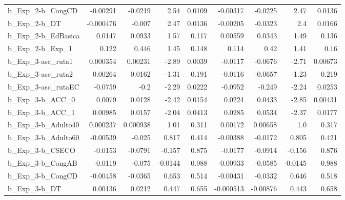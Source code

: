 \begin{tabular}{lrrrrrrrr}
b\_Exp\_2-b\_CongCD           &    -0.00291 &      -0.0219 &      2.54 &   0.0109 &   -0.00317 &     -0.0225 &         2.47 &        0.0136 \\
b\_Exp\_2-b\_DT               &   -0.000476 &       -0.007 &      2.47 &   0.0136 &   -0.00205 &     -0.0323 &          2.4 &        0.0166 \\
b\_Exp\_2-b\_EdBasica         &      0.0147 &       0.0933 &      1.57 &    0.117 &    0.00559 &      0.0343 &         1.49 &         0.136 \\
b\_Exp\_2-b\_Exp\_1            &       0.122 &        0.446 &      1.45 &    0.148 &      0.114 &        0.42 &         1.41 &          0.16 \\
b\_Exp\_3-asc\_ruta1          &    0.000354 &      0.00231 &     -2.89 &   0.0039 &    -0.0117 &     -0.0676 &        -2.71 &       0.00673 \\
b\_Exp\_3-asc\_ruta2          &     0.00264 &       0.0162 &     -1.31 &    0.191 &    -0.0116 &     -0.0657 &        -1.23 &         0.219 \\
b\_Exp\_3-asc\_rutaEC         &     -0.0759 &         -0.2 &     -2.29 &   0.0222 &    -0.0952 &      -0.249 &        -2.24 &        0.0253 \\
b\_Exp\_3-b\_ACC\_0            &      0.0079 &       0.0128 &     -2.42 &   0.0154 &     0.0224 &      0.0433 &        -2.85 &       0.00431 \\
b\_Exp\_3-b\_ACC\_1            &     0.00985 &       0.0157 &     -2.04 &   0.0413 &     0.0285 &      0.0534 &        -2.37 &        0.0177 \\
b\_Exp\_3-b\_Adulto40         &    0.000237 &     0.000938 &      1.01 &    0.311 &    0.00172 &     0.00658 &          1.0 &         0.317 \\
b\_Exp\_3-b\_Adulto60         &    -0.00539 &       -0.025 &     0.817 &    0.414 &   -0.00388 &     -0.0172 &        0.805 &         0.421 \\
b\_Exp\_3-b\_CSECO            &     -0.0153 &      -0.0791 &    -0.157 &    0.875 &    -0.0177 &     -0.0914 &       -0.156 &         0.876 \\
b\_Exp\_3-b\_CongAB           &     -0.0119 &       -0.075 &   -0.0144 &    0.988 &   -0.00933 &     -0.0585 &      -0.0145 &         0.988 \\
b\_Exp\_3-b\_CongCD           &    -0.00458 &      -0.0365 &     0.653 &    0.514 &   -0.00431 &     -0.0332 &        0.646 &         0.518 \\
b\_Exp\_3-b\_DT               &     0.00136 &       0.0212 &     0.447 &    0.655 &  -0.000513 &    -0.00876 &        0.443 &         0.658 \\

\end{tabular}
